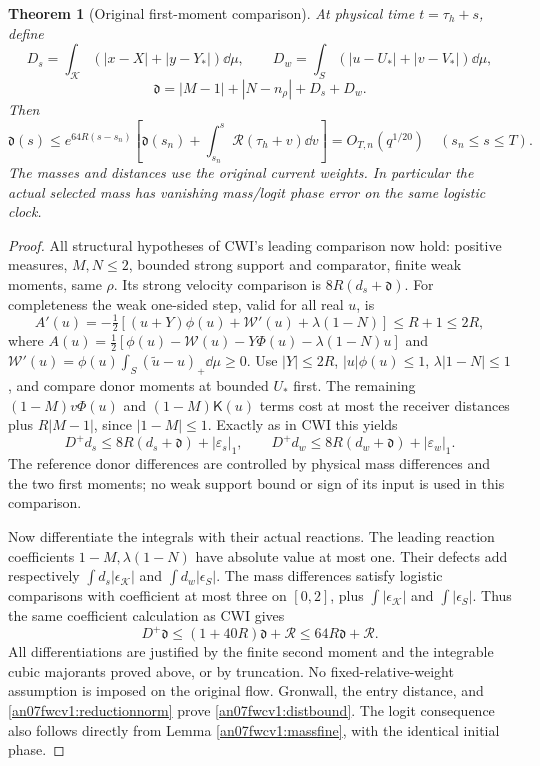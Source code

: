 \documentclass[11pt]{article}
\numberwithin{equation}{section}
\newtheorem{theorem}{Theorem}[section]
\newcommand{\KK}{\mathcal K}\newcommand{\BB}{\mathcal B}
\newcommand{\dist}{\mathfrak d}\newcommand{\one}{\mathbf1}
\newcommand{\Kfun}{\mathsf K}\newcommand{\Ffun}{\mathsf F}
\begin{document}
\begin{theorem}[Original first-moment comparison]
\label{an07fwcv1:propagation}
At physical time \(t=\tau_h+s\), define
\[
 D_s=\int_\KK(|x-X|+|y-Y_*|)\dd\mu,\qquad
 D_w=\int_S(|u-U_*|+|v-V_*|)\dd\mu,
\]
\[
 \dist=|M-1|+|N-n_\rho|+D_s+D_w.
\]
Then
\begin{equation}
 \dist(s)\le e^{64R(s-s_n)}
 \left[\dist(s_n)+\int_{s_n}^s\mathcal R(\tau_h+v)\dd v\right]
 =O_{T,n}(q^{1/20})
 \quad(s_n\le s\le T).
 \label{an07fwcv1:distbound}
\end{equation}
The masses and distances use the original current weights.
In particular the actual selected mass has vanishing mass/logit
phase error on the same logistic clock.
\end{theorem}
\begin{proof}
All structural hypotheses of CWI's leading comparison now hold:
positive measures, \(M,N\le2\), bounded strong support and
comparator, finite weak moments, same \(\rho\). Its strong
velocity comparison is \(8R(d_s+\dist)\).
For completeness the weak one-sided step, valid for all real \(u\),
is
\[
 A'(u)=-\tfrac12[(u+Y)\phi(u)+\mathcal W'(u)
                           +\lambda(1-N)]\le R+1\le2R,
\]
where
\(A(u)=\tfrac12[\phi(u)-\mathcal W(u)-Y\Phi(u)
                         -\lambda(1-N)u]\) and
\(\mathcal W'(u)=\phi(u)\int_S(\widetilde u-u)_+\dd\mu\ge0\).
Use \(|Y|\le2R\), \(|u|\phi(u)\le1\),
\(\lambda|1-N|\le1\), and compare donor moments at bounded
\(U_*\) first. The remaining \((1-M)v\Phi(u)\) and
\((1-M)\Kfun(u)\) terms cost at most the receiver distances
plus \(R|M-1|\), since \(|1-M|\le1\).
Exactly as in CWI this yields
\[
 D^+d_s\le8R(d_s+\dist)+|\varepsilon_s|_1,
 \qquad D^+d_w\le8R(d_w+\dist)+|\varepsilon_w|_1.
\]
The reference donor differences are controlled by physical
mass differences and the two first moments; no weak support
bound or sign of its input is used in this comparison.

Now differentiate the integrals with their actual reactions.
The leading reaction coefficients \(1-M,\lambda(1-N)\)
have absolute value at most one. Their defects add respectively
\(\int d_s|\epsilon_\KK|\) and \(\int d_w|\epsilon_S|\).
The mass differences satisfy logistic comparisons with
coefficient at most three on \([0,2]\), plus
\(\int|\epsilon_\KK|\) and \(\int|\epsilon_S|\).
Thus the same coefficient calculation as CWI gives
\[
 D^+\dist\le(1+40R)\dist+\mathcal R
                \le64R\dist+\mathcal R.
\]
All differentiations are justified by the finite second moment
and the integrable cubic majorants proved above, or by truncation.
No fixed-relative-weight assumption is imposed on the original
flow. Gronwall, the entry distance, and
\eqref{an07fwcv1:reductionnorm} prove \eqref{an07fwcv1:distbound}.
The logit consequence also follows directly from Lemma
\ref{an07fwcv1:massfine}, with the identical initial phase.
\end{proof}
\end{document}
